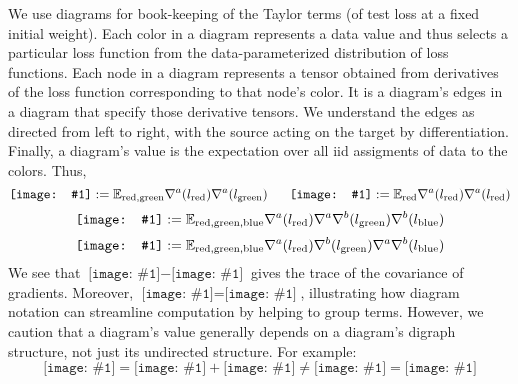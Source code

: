 \documentclass[12pt]{article}
\newcommand{\dia}[1]{\texttt{[image: \#1]}}
\begin{document}
        We use diagrams for book-keeping of the Taylor terms (of test loss at a fixed initial weight). 
        Each color in a diagram represents a data value and thus selects a particular loss function from the
        data-parameterized distribution of loss functions.  Each node in a diagram represents a tensor obtained from
        derivatives of the loss function corresponding to that node's color.  It is a diagram's edges in a diagram that
        specify those derivative tensors.  We understand the edges as directed from left to right, with the source
        acting on the target by differentiation.  Finally, a diagram's value is the expectation over all iid assigments
        of data to the colors.  Thus,
        $$
            \dia{rg} := \expec_{\text{red},\text{green}} \nabla^a(l_{\text{red}}) \nabla^a(l_{\text{green}})
            ~~~~~
            \dia{rr} := \expec_{\text{red}} \nabla^a(l_{\text{red}}) \nabla^a(l_{\text{red}})
        $$
        $$
            \dia{rgb} := \expec_{\text{red},\text{green},\text{blue}} \nabla^a(l_{\text{red}}) \nabla^a \nabla^b(l_{\text{green}}) \nabla^b(l_{\text{blue}})
        $$
        $$
            \dia{sgd-2b} := \expec_{\text{red},\text{green},\text{blue}} \nabla^a(l_{\text{red}}) \nabla^b(l_{\text{green}}) \nabla^a \nabla^b(l_{\text{blue}})
        $$
        We see that $\dia{rr}-\dia{rg}$ gives the trace of the covariance of gradients.
        Moreover, $\dia{sgd-2a} = \dia{sgd-2b}$, illustrating how diagram notation can streamline computation by
        helping to group terms.  However, we caution that a diagram's value generally depends on a diagram's digraph 
        structure, not just its undirected structure.  For example:  
        $$
            \dia{rggb} = \dia{rggb-a} + \dia{rggb-b} \neq \dia{rrgb-a} = \dia{rrgb} 
        $$
\end{document}
